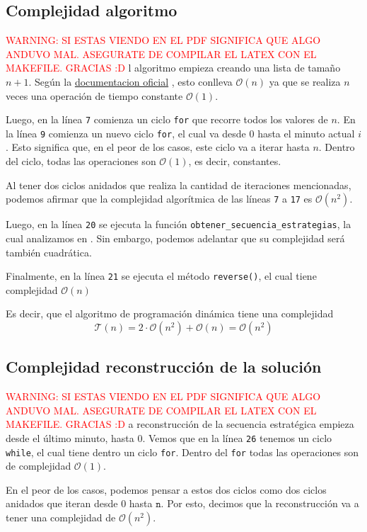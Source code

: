 \documentclass{article}
\newcommand{\docuPy}{%
  {\href{https://wiki.python.org/moin/TimeComplexity}{documentacion oficial}}
  }%
\newcommand{\funcionArchivo}[2]{%
  {\textcolor{red}{WARNING: SI ESTAS VIENDO EN EL PDF SIGNIFICA QUE ALGO ANDUVO MAL. ASEGURATE DE COMPILAR EL LATEX CON EL MAKEFILE. GRACIAS :D}}
  }%
\begin{document}
\subsection{Complejidad algoritmo}
\funcionArchivo{codigo/algoritmo.py eliminar_enemigos}
El algoritmo empieza creando una lista de tamaño $n + 1$. Según la \docuPy, esto conlleva $\mathcal{O}(n)$ ya que se realiza $n$ veces una operación de tiempo constante $\mathcal{O}(1)$.

Luego, en la línea \texttt{7} comienza un ciclo \texttt{for} que recorre todos los valores de $n$. En la línea \texttt{9} comienza un nuevo ciclo \texttt{for}, el cual va desde 0 hasta el minuto actual $i$. Esto significa que, en el peor de los casos, este ciclo va a iterar hasta $n$. Dentro del ciclo, todas las operaciones son $\mathcal{O}(1)$, es decir, constantes.

Al tener dos ciclos anidados que realiza la cantidad de iteraciones mencionadas, podemos afirmar que la complejidad algorítmica de las líneas \texttt{7} a \texttt{17} es $\mathcal{O}(n^2)$.

Luego, en la línea \texttt{20} se ejecuta la función \texttt{obtener\_secuencia\_estrategias}, la cual analizamos en . Sin embargo, podemos adelantar que su complejidad será también cuadrática.

Finalmente, en la línea \texttt{21} se ejecuta el método \texttt{reverse()}, el cual tiene complejidad $\mathcal{O}(n)$

Es decir, que el algoritmo de programación dinámica tiene una complejidad 
$$
\mathcal{T}(n) = 2 \cdot \mathcal{O}(n^2) + \mathcal{O}(n) = \mathcal{O}(n^2)
$$


\subsection{Complejidad reconstrucción de la solución}
\label{sec:reconstruccion}

\funcionArchivo{codigo/algoritmo.py obtener_secuencia_estrategias}
La reconstrucción de la secuencia estratégica empieza desde el último minuto, hasta 0.
Vemos que en la línea \texttt{26} tenemos un ciclo \texttt{while}, el cual tiene dentro un ciclo \texttt{for}.
Dentro del \texttt{for} todas las operaciones son de complejidad $\mathcal{O}(1)$.

En el peor de los casos, podemos pensar a estos dos ciclos como dos ciclos anidados que iteran desde 0 hasta $\texttt{n}$. Por esto, decimos que la reconstrucción va a tener una complejidad de $\mathcal{O}(n^2)$.
\end{document}
